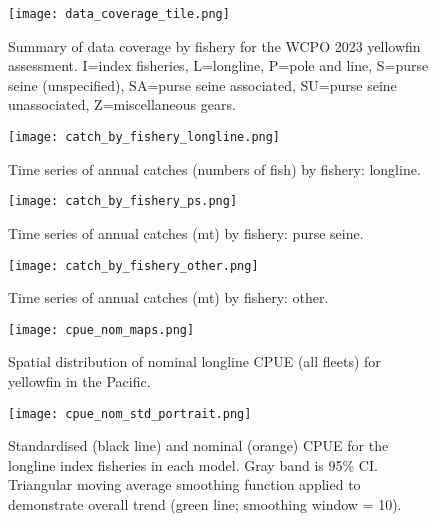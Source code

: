 \newpage
\begin{landscape}
  \begin{figure}[!ht]
    \centering
    \texttt{[image: data\_coverage\_tile.png]}
    \caption{Summary of data coverage by fishery for the WCPO 2023 yellowfin assessment. I=index fisheries, L=longline, P=pole and line, S=purse seine (unspecified), SA=purse seine associated, SU=purse seine unassociated, Z=miscellaneous gears. \label{fig:data_coverage_tile}}
  \end{figure}
\end{landscape}
\clearpage

\newpage
\begin{landscape}
  \begin{figure}[H]
    \centering
    \texttt{[image: catch\_by\_fishery\_longline.png]}
    \caption{Time series of annual catches (numbers of fish) by fishery: longline. \label{fig:catch_by_fishery_longline}}
  \end{figure}

  \begin{figure}[H]
    \centering
    \texttt{[image: catch\_by\_fishery\_ps.png]}
    \caption{Time series of annual catches (mt) by fishery: purse seine. \label{fig:catch_by_fishery_ps}}
  \end{figure}

  \begin{figure}[H]
    \centering
    \texttt{[image: catch\_by\_fishery\_other.png]}
    \caption{Time series of annual catches (mt) by fishery: other. \label{fig:catch_by_fishery_other}}
  \end{figure}
\end{landscape}
\clearpage

\newpage
\begin{landscape}
  \begin{figure}[!ht]
    \centering
    \texttt{[image: cpue\_nom\_maps.png]}
    \caption{Spatial distribution of nominal longline CPUE (all fleets) for yellowfin in the Pacific. \label{fig:cpue_nom_maps}}
  \end{figure}
\end{landscape}
\clearpage

\newpage
\begin{figure}[!ht]
  \centering
  \texttt{[image: cpue\_nom\_std\_portrait.png]}
  \caption{Standardised (black line) and nominal (orange) CPUE for the longline index fisheries in each model. Gray band is 95\% CI. Triangular moving average smoothing function applied to demonstrate overall trend (green line; smoothing window = 10). 	\label{fig:cpue_nom_std_1_5}}
\end{figure}
\clearpage
\newpage

